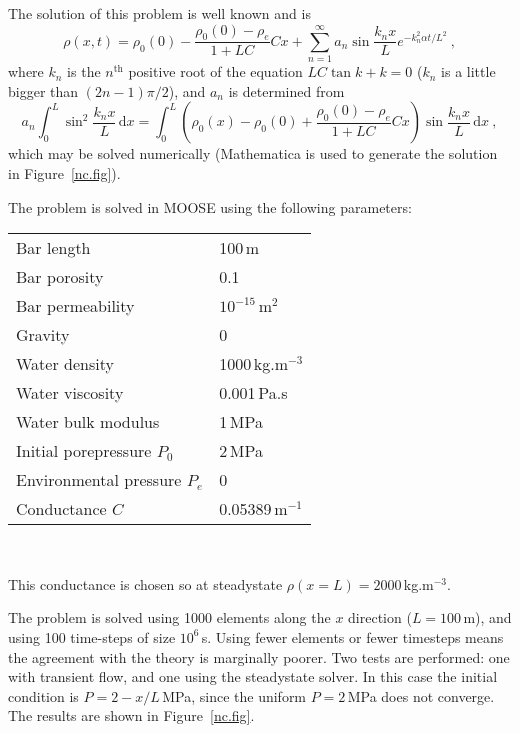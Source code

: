 \documentclass[]{scrreprt}
\begin{document}
The solution of this problem is well known and is
\begin{equation}
\rho(x, t) = \rho_{0}(0) - \frac{\rho_{0}(0) - \rho_{e}}{1 + LC}Cx +
\sum_{n=1}^{\infty} a_{n}\sin \frac{k_{n}x}{L}e^{-k_{n}^{2}\alpha
  t/L^{2}} \ ,
\end{equation}
where $k_{n}$ is the $n^{\mathrm{th}}$ positive root of the equation
$LC\tan k + k=0$  ($k_{n}$ is a little bigger than
$(2n-1)\pi/2$), and $a_{n}$ is determined from
\begin{equation}
a_{n}\int_{0}^{L}\sin^{2}\frac{k_{n}x}{L}\,\mathrm{d}x =
\int_{0}^{L}\left(\rho_{0}(x) - \rho_{0}(0) + \frac{\rho_{0}(0) -
  \rho_{e}}{1 + LC}Cx\right)\sin \frac{k_{n}x}{L}\,\mathrm{d}x \ ,
\end{equation}
which may be solved numerically (Mathematica is used to generate
the solution in Figure~\ref{nc.fig}).

\noindent The problem is solved in MOOSE using the following parameters:
\begin{center}
\begin{tabular}{|ll|}
\hline
Bar length & 100\,m \\
Bar porosity & 0.1 \\
Bar permeability & $10^{-15}$\,m$^{2}$ \\
\hline
Gravity & 0 \\
\hline
Water density & 1000\,kg.m$^{-3}$ \\
Water viscosity & 0.001\,Pa.s \\
Water bulk modulus & 1\,MPa \\
\hline
Initial porepressure $P_{0}$ & 2\,MPa \\
Environmental pressure $P_{e}$ & 0 \\
\hline
Conductance $C$ & 0.05389\,m$^{-1}$ \\
\hline
\end{tabular} \\
\end{center}
This conductance is chosen so at steadystate $\rho(x=L)=2000$\,kg.m$^{-3}$.

The problem is solved using 1000 elements along the $x$ direction
($L=100$\,m), and using 100 time-steps of size $10^6$\,s.  Using fewer
elements or fewer timesteps means the agreement with the theory is
marginally poorer.  Two tests are performed: one with transient flow,
and one using the steadystate solver.  In this case the initial
condition is $P=2-x/L$\,MPa, since the uniform $P=2$\,MPa does not
converge.  The results are shown in Figure~\ref{nc.fig}.
\end{document}
